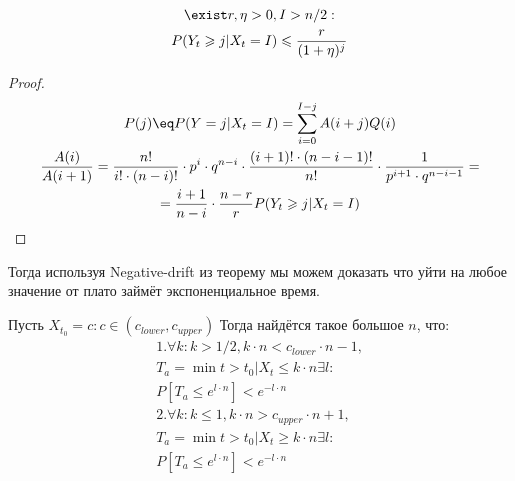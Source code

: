 \documentclass[times]{itmo-student-thesis}
\begin{document}
    \begin{theorem}
        \begin{gather*}
            \exist r, \eta > 0, I > n/2: \\
            P(Y_t \geq j|X_t = I) \leq \frac{r}{(1 + \eta)^j}
        \end{gather*}
    \end{theorem}

    \begin{proof}
        \begin{gather*}
            P(j) \eq P(Y = j|X_t = I) = \sum_{i = 0}^{I - j} A(i + j)Q(i) \\
            \frac{A(i)}{A(i + 1)} = \frac{n!}{i! \cdot (n - i)!} \cdot p^i \cdot q^{n - i} \cdot \frac{(i + 1)! \cdot (n - i - 1)!}{n!} \cdot \frac{1}{p^{i + 1} \cdot q^{n - i - 1}} = \\
            = \frac{i + 1}{n - i} \cdot \frac{n - r}{r}
            P(Y_t \geq j|X_t = I)
        \end{gather*}

    \end{proof}

    Тогда используя Negative-drift из \cite{drifts_1} теорему мы можем доказать что уйти на любое значение от плато займёт экспоненциальное время.

    \begin{theorem}
        Пусть $X_{t_0} = c: c \in (c_{lower}, c_{upper})$
        Тогда найдётся такое большое $n$, что:
        \begin{gather*}
            1. \forall k : k > 1/2, k \cdot n < c_{lower} \cdot n - 1, \\
            T_a = \min{t > t_0 | X_t \leq k \cdot n} \exists l: \\
            P[T_a \leq e^{l\cdot n}] < e^{-l\cdot n} \\
            2. \forall k : k  \leq 1, k \cdot n > c_{upper} \cdot n + 1, \\
            T_a = \min{t > t_0 | X_t \geq k \cdot n} \exists l: \\
            P[T_a \leq e^{l\cdot n}] < e^{-l\cdot n} \\
        \end{gather*}
    \end{theorem}
\end{document}
